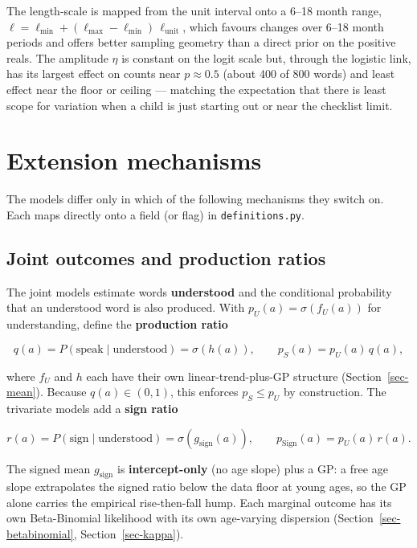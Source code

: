 \documentclass[
  11pt,
  a4paper,
]{report}
\begin{document}
The length-scale is mapped from the unit interval onto a 6--18 month
range,
\(\ell = \ell_{\min} + (\ell_{\max} - \ell_{\min})\,\ell_\text{unit}\),
which favours changes over 6--18 month periods and offers better
sampling geometry than a direct prior on the positive reals. The
amplitude \(\eta\) is constant on the logit scale but, through the
logistic link, has its largest effect on counts near \(p \approx 0.5\)
(about 400 of 800 words) and least effect near the floor or ceiling ---
matching the expectation that there is least scope for variation when a
child is just starting out or near the checklist limit.

\section{Extension mechanisms}\label{extension-mechanisms}

The models differ only in which of the following mechanisms they switch
on. Each maps directly onto a field (or flag) in
\texttt{definitions.py}.

\subsection{Joint outcomes and production ratios}\label{sec-ratios}

The joint models estimate words \textbf{understood} and the conditional
probability that an understood word is also produced. With
\(p_U(a) = \sigma(f_U(a))\) for understanding, define the
\textbf{production ratio}

\[
q(a) = P(\text{speak} \mid \text{understood}) = \sigma(h(a)),
\qquad
p_S(a) = p_U(a)\,q(a),
\]

where \(f_U\) and \(h\) each have their own linear-trend-plus-GP
structure (Section~\ref{sec-mean}). Because \(q(a) \in (0,1)\), this
enforces \(p_S \le p_U\) by construction. The trivariate models add a
\textbf{sign ratio}

\[
r(a) = P(\text{sign} \mid \text{understood}) = \sigma(g_{\text{sign}}(a)),
\qquad
p_{\text{Sign}}(a) = p_U(a)\,r(a) .
\]

The signed mean \(g_{\text{sign}}\) is \textbf{intercept-only} (no age
slope) plus a GP: a free age slope extrapolates the signed ratio below
the data floor at young ages, so the GP alone carries the empirical
rise-then-fall hump. Each marginal outcome has its own Beta-Binomial
likelihood with its own age-varying dispersion
(Section~\ref{sec-betabinomial}, Section~\ref{sec-kappa}).
\end{document}
